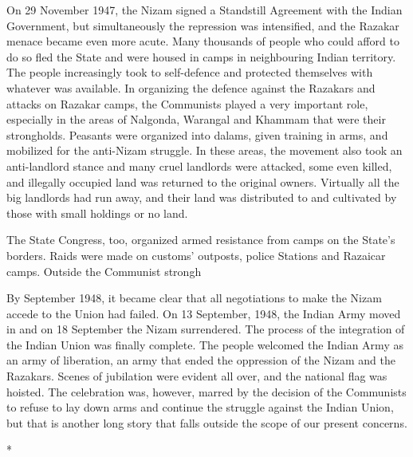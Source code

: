 \begin{multicols}{2}
On 29 November 1947, the Nizam signed a Standstill Agreement with the Indian Government, but simultaneously the repression was intensified, and the Razakar menace became even more acute. Many thousands of people who could afford to do so fled the State and were housed in camps in neighbouring Indian territory. The people increasingly took to self-defence and protected themselves with whatever was available. In organizing the defence against the Razakars and attacks on Razakar camps, the Communists played a very important role, especially in the areas of Nalgonda, Warangal and Khammam that were their strongholds. Peasants were organized into dalams, given training in arms, and mobilized for the anti-Nizam struggle. In these areas, the movement also took an anti-landlord stance and many cruel landlords were attacked, some even killed, and illegally occupied land was returned to the original owners. Virtually all the big landlords had run away, and their land was distributed to and cultivated by those with small holdings or no land. 

The State Congress, too, organized armed resistance from camps on the State's borders. Raids were made on customs' outposts, police Stations and Razaicar camps. Outside the Communist strongh%

By September 1948, it became clear that all negotiations to make the Nizam accede to the Union had failed. On 13 September, 1948, the Indian Army moved in and on 18 September the Nizam surrendered. The process of the integration of the Indian Union was finally complete. The people welcomed the Indian Army as an army of liberation, an army that ended the oppression of the Nizam and the Razakars. Scenes of jubilation were evident all over, and the national flag was hoisted. The celebration was, however, marred by the decision of the Communists to refuse to lay down arms and continue the struggle against the Indian Union, but that is another long story that falls outside the scope of our present concerns.

\begin{center}*\end{center}

\paragraph*{}


\end{multicols}
